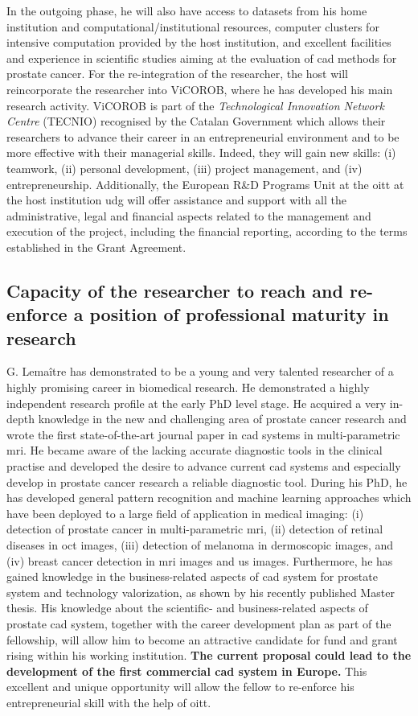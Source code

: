 In the outgoing phase, he will also have access to datasets from his home institution and computational/institutional resources, computer clusters for intensive computation provided by the host institution, and excellent facilities and experience in scientific studies aiming at the evaluation of \ac{cad} methods for prostate cancer. 
For the re-integration of the researcher, the host will reincorporate the researcher into ViCOROB, where he has developed his main research activity.
ViCOROB is part of the \emph{Technological Innovation Network Centre} (TECNIO) recognised by the Catalan Government which allows their researchers to advance their career in an entrepreneurial environment and to be more effective with their managerial skills.
Indeed, they will gain new skills: (i) teamwork, (ii) personal development, (iii) project management, and (iv) entrepreneurship.
Additionally, the European R\&D Programs Unit at the \ac{oitt} at the host institution \ac{udg} will offer assistance and support with all the administrative, legal and financial aspects related to the management and execution of the project, including the financial reporting, according to the terms established in the Grant Agreement.


\subsection{Capacity of the researcher to reach and re-enforce a position of professional maturity in research}
\label{sec:maturity}

G. Lema\^itre has demonstrated to be a young and very talented researcher of a highly promising career in biomedical research.
He demonstrated a highly independent research profile at the early PhD level stage. 
He acquired a very in-depth knowledge in the new and challenging area of prostate cancer research and wrote the first state-of-the-art journal paper in \ac{cad} systems in multi-parametric \ac{mri}.
He became aware of the lacking accurate diagnostic tools in the clinical practise and developed the desire to advance current \ac{cad} systems and especially develop in prostate cancer research a reliable diagnostic tool. 
During his PhD, he has developed general pattern recognition and machine learning approaches which have been deployed to a large field of application in medical imaging: (i) detection of prostate cancer in multi-parametric \ac{mri}, (ii) detection of retinal diseases in \ac{oct} images, (iii) detection of melanoma in dermoscopic images, and (iv) breast cancer detection in \ac{mri} images and \ac{us} images. 
Furthermore, he has gained knowledge in the business-related aspects of \ac{cad} system for prostate system and technology valorization, as shown by his recently published Master thesis.
His knowledge about the scientific- and business-related aspects of prostate \ac{cad} system, together with the career development plan as part of the fellowship, will allow him to become an attractive candidate for fund and grant rising within his working institution.
\textbf{The current proposal could lead to the development of the first commercial \ac{cad} system in Europe.}
This excellent and unique opportunity will allow the fellow to re-enforce his entrepreneurial skill with the help of \ac{oitt}. 
